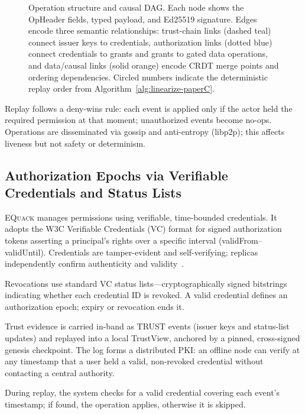 \documentclass[10pt,journal,compsoc]{IEEEtran}
\newcommand{\equack}{\textsc{EQuack}}
\begin{document}
\begin{figure}[htbp]
\centering
\resizebox{\textwidth}{!}{}
\caption{Operation structure and causal DAG\@. Each node shows the OpHeader fields, typed payload, and Ed25519 signature. Edges encode three semantic relationships: trust-chain links (dashed teal) connect issuer keys to credentials, authorization links (dotted blue) connect credentials to grants and grants to gated data operations, and data/causal links (solid orange) encode CRDT merge points and ordering dependencies. Circled numbers indicate the deterministic replay order from Algorithm~\ref{alg:linearize-paperC}.}
\label{fig:dag-structure-paperC}
\end{figure}

Replay follows a deny-wins rule: each event is applied only if the actor held the required permission at that moment; unauthorized events become no-ops. Operations are disseminated via gossip and anti-entropy (libp2p); this affects liveness but not safety or determinism.

\subsection{Authorization Epochs via Verifiable Credentials and Status Lists}

\equack{} manages permissions using verifiable, time-bounded credentials. It adopts the W3C Verifiable Credentials (VC) format for signed authorization tokens asserting a principal's rights over a specific interval (validFrom--validUntil). Credentials are tamper-evident and self-verifying; replicas independently confirm authenticity and validity~\cite{8603785}.

Revocations use standard VC status lists---cryptographically signed bitstrings indicating whether each credential ID is revoked. A valid credential defines an authorization epoch; expiry or revocation ends it.

Trust evidence is carried in-band as TRUST events (issuer keys and status-list updates) and replayed into a local TrustView, anchored by a pinned, cross-signed genesis checkpoint. The log forms a distributed PKI: an offline node can verify at any timestamp that a user held a valid, non-revoked credential without contacting a central authority.

During replay, the system checks for a valid credential covering each event's timestamp; if found, the operation applies, otherwise it is skipped.
\end{document}
